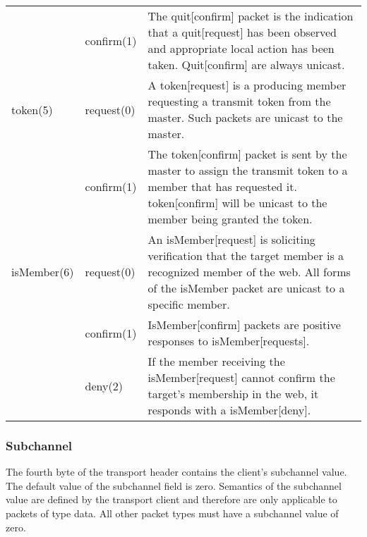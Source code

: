 \documentclass[11pt]{article}
\begin{document}
\begin{center}
\begin{longtable}{llp{}}
            & confirm(1) & The quit[confirm] packet is the indication
                           that a quit[request] has been observed and
                           appropriate local action has been taken.
                           Quit[confirm] are always unicast. \\

   token(5) & request(0) & A token[request] is a producing member
                           requesting a transmit token from the master.
                           Such packets are unicast to the master. \\

            & confirm(1) & The token[confirm] packet is sent by the
                           master to assign the transmit token to a
                           member that has requested it. token[confirm]
                           will be unicast to the member being granted
                           the token. \\

   isMember(6)&request(0)& An isMember[request] is soliciting
                           verification that the target member is a
                           recognized member of the web. All forms of
                           the isMember packet are unicast to a specific
                           member. \\

            & confirm(1) & IsMember[confirm] packets are positive
                           responses to isMember[requests]. \\

            & deny(2)    & If the member receiving the isMember[request]
                           cannot confirm the target's membership in the
                           web, it responds with a isMember[deny].
\end{longtable}
\end{center}

\hypertarget{subchannel}{\subsubsection{Subchannel}}

   The fourth byte of the transport header contains the client's
   subchannel value. The default value of the subchannel field is zero.
   Semantics of the subchannel value are defined by the transport client
   and therefore are only applicable to packets of type data. All other
   packet types must have a subchannel value of zero.
\end{document}
